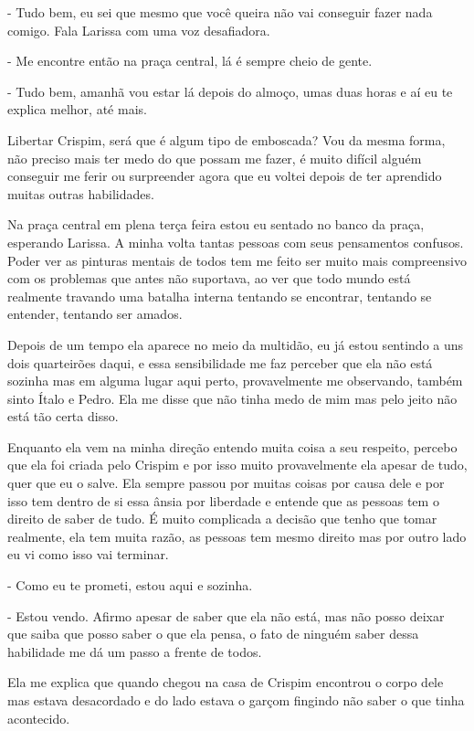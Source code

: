- Tudo bem, eu sei que mesmo que você queira não vai conseguir fazer nada comigo. Fala Larissa com uma voz desafiadora.

- Me encontre então na praça central, lá é sempre cheio de gente.

- Tudo bem, amanhã vou estar lá depois do almoço, umas duas horas e aí eu te explica melhor, até mais.

Libertar Crispim, será que é algum tipo de emboscada? Vou da mesma forma, não preciso mais ter medo do que possam me fazer, é muito difícil alguém conseguir me ferir ou surpreender agora que eu voltei depois de ter aprendido muitas outras habilidades.

Na praça central em plena terça feira estou eu sentado no banco da praça, esperando Larissa. A minha volta tantas pessoas com seus pensamentos confusos. Poder ver as pinturas mentais de todos tem me feito ser muito mais compreensivo com os problemas que antes não suportava, ao ver que todo mundo está realmente travando uma batalha interna tentando se encontrar, tentando se entender, tentando ser amados.

Depois de um tempo ela aparece no meio da multidão, eu já estou sentindo a uns dois quarteirões daqui, e essa sensibilidade me faz perceber que ela não está sozinha mas em alguma lugar aqui perto, provavelmente me observando, também sinto Ítalo e Pedro. Ela me disse que não tinha medo de mim mas pelo jeito não está tão certa disso.

Enquanto ela vem na minha direção entendo muita coisa a seu respeito, percebo que ela foi criada pelo Crispim e por isso muito provavelmente ela apesar de tudo, quer que eu o salve. Ela sempre passou por muitas coisas por causa dele e por isso tem dentro de si essa ânsia por liberdade e entende que as pessoas tem o direito de saber de tudo. É muito complicada a decisão que tenho que tomar realmente, ela tem muita razão, as pessoas tem mesmo direito mas por outro lado eu vi como isso vai terminar.

- Como eu te prometi, estou aqui e sozinha.

- Estou vendo. Afirmo apesar de saber que ela não está, mas não posso deixar que saiba que posso saber o que ela pensa, o fato de ninguém saber dessa habilidade me dá um passo a frente de todos.

Ela me explica que quando chegou na casa de Crispim encontrou o corpo dele mas estava desacordado e do lado estava o garçom fingindo não saber o que tinha acontecido.

